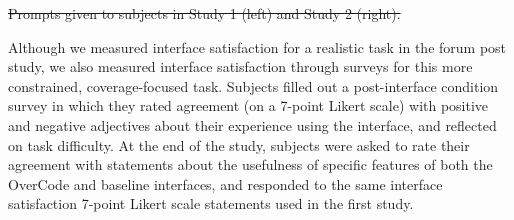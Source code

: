 \documentclass[12pt,twoside]{mitthesis}
\providecommand{\DIFaddtex}[1]{{\protect\color{blue}\uwave{#1}}} %
\providecommand{\DIFdeltex}[1]{{\protect\color{red}\sout{#1}}}                      %
\providecommand{\DIFaddbegin}{} %
\providecommand{\DIFaddend}{} %
\providecommand{\DIFdelbegin}{} %
\providecommand{\DIFdelend}{} %
\providecommand{\DIFdelFL}[1]{\DIFdel{#1}} %
\providecommand{\DIFadd}[1]{\texorpdfstring{\DIFaddtex{#1}}{#1}} %
\providecommand{\DIFdel}[1]{\texorpdfstring{\DIFdeltex{#1}}{}} %
\begin{document}
{{{{{{{{{{\DIFdelbegin %
{%
\DIFdelFL{Prompts given to subjects in Study 1 (left) and Study 2 (right).}}

\DIFdelend \DIFaddbegin {\bf \DIFadd{Surveys}} \DIFaddend Although we measured interface satisfaction for a realistic task in the forum post study, we also measured interface satisfaction through surveys for this more constrained, coverage-focused task. Subjects filled out a post-interface condition survey in which they rated agreement (on a 7-point Likert scale) with positive and negative adjectives about their experience using the interface, and reflected on task difficulty. At the end of the study, subjects were asked to rate their agreement with statements about the usefulness of specific features of both the OverCode and baseline interfaces, and responded to the same interface satisfaction 7-point Likert scale statements used in the first study.

}}}}}}}}}}
\end{document}

